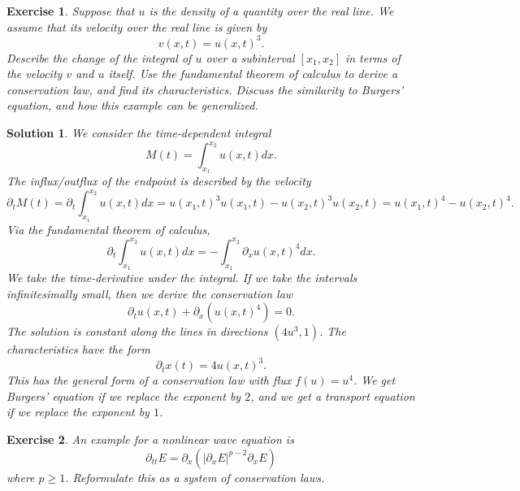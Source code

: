 \documentclass[10pt,letterpaper]{article}
\theoremstyle{break}
\newtheorem{exercise}{Exercise}
\newtheorem{mysolution}{Solution}
\newenvironment{solution}{\begin{mysolution}}{\end{mysolution}}
\begin{document}
\begin{exercise}
    Suppose that $u$ is the density of a quantity over the real line.
    We assume that its velocity over the real line is given by
    $$
        v(x,t) = u(x,t)^3.
    $$
    Describe the change of the integral of $u$ over a subinterval $[x_1,x_2]$ in terms of the velocity $v$ and $u$ itself. Use the fundamental theorem of calculus to derive a conservation law, and find its characteristics. 
    Discuss the similarity to Burgers' equation, and how this example can be generalized.
\end{exercise}

\begin{solution}
    We consider the time-dependent integral 
    $$
        M(t) = \int_{x_1}^{x_2} u(x,t) dx.
    $$
    The influx/outflux of the endpoint is described by the velocity 
    $$
        \partial_t M(t) 
        =
        \partial_t \int_{x_1}^{x_2} u(x,t) dx
        =
        u(x_1,t)^3 u(x_1,t) - u(x_2,t)^3 u(x_2,t) 
        =
        u(x_1,t)^4 - u(x_2,t)^4 
        .
    $$
    Via the fundamental theorem of calculus,
    $$
        \partial_t \int_{x_1}^{x_2} u(x,t) dx
        =
        - \int_{x_1}^{x_2} \partial_x u(x,t)^4 dx
        .
    $$
    We take the time-derivative under the integral. 
    If we take the intervals infinitesimally small, then we derive the conservation law
    $$
        \partial_t u(x,t)
        +
        \partial_x \left( u(x,t)^4 \right)
        =
        0
        .
    $$
    The solution is constant along the lines in directions $(4u^3,1)$.
    The characteristics have the form 
    $$
        \partial_t x(t) = 4u(x,t)^3.
    $$
    This has the general form of a conservation law with flux $f(u) = u^4$.
    We get Burgers' equation if we replace the exponent by $2$,
    and we get a transport equation if we replace the exponent by $1$.
\end{solution}





\begin{exercise}
    An example for a nonlinear wave equation is
    $$
        \partial_{tt} E = \partial_{x} \left( |\partial_x E|^{p-2} \partial_x E \right)
    $$
    where $p \geq 1$. Reformulate this as a system of conservation laws.
\end{exercise}
\end{document}
